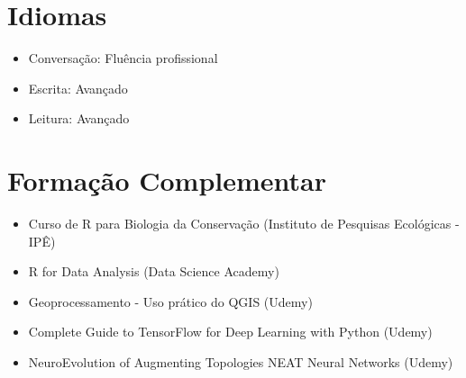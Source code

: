 \documentclass[a4paper,10pt]{article}
\begin{document}
	\section*{Idiomas}
	\begin{itemize}[left=0pt]
		\item Conversação: Fluência profissional
		\item Escrita: Avançado
		\item Leitura: Avançado
	\end{itemize}
	
	\section*{Formação Complementar}
	\begin{itemize}[left=0pt]
		\item Curso de R para Biologia da Conservação (Instituto de Pesquisas Ecológicas - IPÊ)
		\item R for Data Analysis (Data Science Academy)
		\item Geoprocessamento - Uso prático do QGIS (Udemy)
		\item Complete Guide to TensorFlow for Deep Learning with Python (Udemy)
		\item NeuroEvolution of Augmenting Topologies NEAT Neural Networks (Udemy)
	\end{itemize}
	
\end{document}
